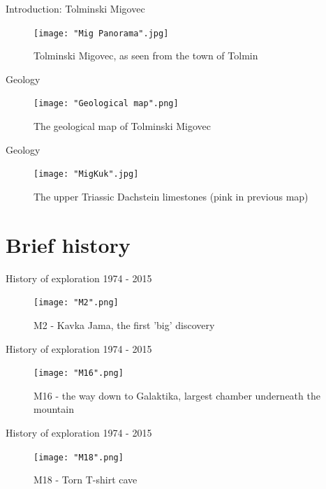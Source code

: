 \documentclass[10pt]{beamer}
\begin{document}
\begin{frame}{Introduction: Tolminski Migovec}
    \begin{figure}[!ht]
    \centering
    \texttt{[image: "Mig Panorama".jpg]}
    \caption{Tolminski Migovec, as seen from the town of Tolmin}
    \end{figure}
\end{frame}

\begin{frame}{Geology}
    \begin{figure}[!ht]
    \centering
    \texttt{[image: "Geological map".png]}
    \caption{The geological map of Tolminski Migovec}
    \end{figure}
\end{frame} 

\begin{frame}{Geology}
    \begin{figure}[!ht]
    \centering
    \texttt{[image: "MigKuk".jpg]}
    \caption{The upper Triassic Dachstein limestones (pink in previous map)}
    \end{figure}
\end{frame} 
\section{Brief history}

\begin{frame}{History of exploration 1974 - 2015}
    \begin{figure}[!ht]
    \centering
    \texttt{[image: "M2".png]}
    \caption{M2 - Kavka Jama, the first 'big' discovery}
    \end{figure}
\end{frame}

  \begin{frame}{History of exploration 1974 - 2015}
    \begin{figure}[!ht]
    \centering
    \texttt{[image: "M16".png]}
    \caption{M16 - the way down to Galaktika, largest chamber underneath the mountain}
    \end{figure}
\end{frame}

\begin{frame}{History of exploration 1974 - 2015}
    \begin{figure}[!ht]
    \centering
    \texttt{[image: "M18".png]}
    \caption{M18  - Torn T-shirt cave}
    \end{figure}
\end{frame}
\end{document}
